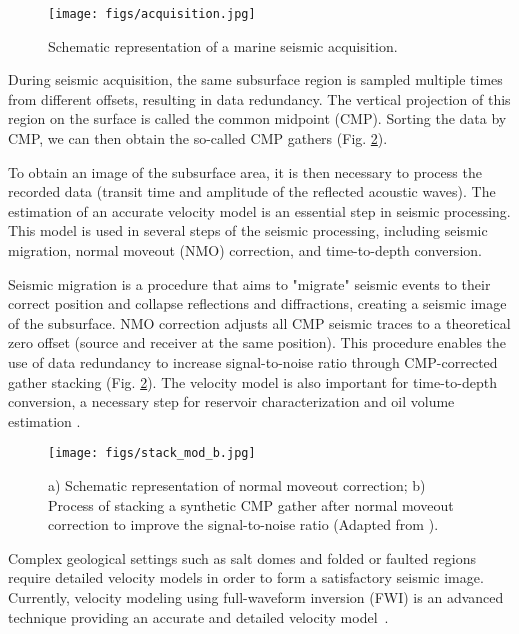 \documentclass[conference]{IEEEtran}
\begin{document}
\begin{figure}[t]
     \centering
     \texttt{[image: figs/acquisition.jpg]}
      \caption{Schematic representation of a marine seismic acquisition.}
     \label{fig:Seismic_Aquisition}
\end{figure}

During seismic acquisition, the same subsurface region is sampled multiple times from different offsets, resulting in data redundancy. The vertical projection of this region on the surface is called the common midpoint (CMP). Sorting the data by CMP, we can then obtain the so-called CMP gathers
(Fig. \ref{fig:Seismic_Stack}).

To obtain an image of the subsurface area, it is then necessary to process the recorded data (transit time and amplitude of the reflected acoustic waves). 
The estimation of an accurate velocity model is an essential step in seismic processing. This model is used in several steps of the seismic processing, including seismic migration, normal moveout (NMO) correction, and time-to-depth conversion.

Seismic migration is a procedure that aims to "migrate" seismic events to their correct position and collapse reflections and diffractions, creating a seismic image of the subsurface\cite{Gazdag_Sguazzero}.
NMO correction adjusts all CMP seismic traces to a theoretical zero offset (source and receiver at the same position)\cite{Yilmaz}. This procedure enables the use of data redundancy to increase signal-to-noise ratio through CMP-corrected gather stacking (Fig. \ref{fig:Seismic_Stack}).
The velocity model is also important for time-to-depth conversion, a necessary step for reservoir characterization and oil volume estimation \cite{schultz1998seismic}.

\begin{figure}[t]
     \centering
     \texttt{[image: figs/stack\_mod\_b.jpg]}
      \caption{a) Schematic representation of normal moveout correction; b) Process of stacking a synthetic CMP gather after normal moveout correction to improve the signal-to-noise ratio (Adapted from \cite{Liu2009StackingSD}).}
     \label{fig:Seismic_Stack}
\end{figure}

Complex geological settings such as salt domes and folded or faulted regions require detailed velocity models in order to form a satisfactory seismic image. Currently, velocity modeling using full-waveform inversion (FWI) is an advanced technique providing an accurate and detailed velocity model~\cite{Kapoor2012FullWI}.
\end{document}
